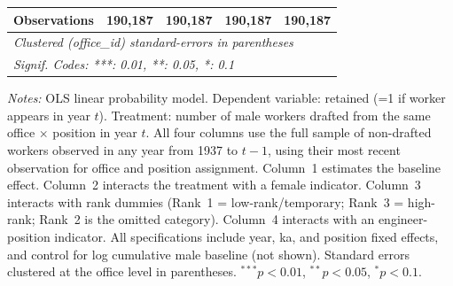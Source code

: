 \begin{table}[htbp]
\begin{threeparttable}
\begin{tabular}{lcccc}
   Observations                   & 190,187  & 190,187          & 190,187        & 190,187\\  
   \midrule \midrule
   \multicolumn{5}{l}{\emph{Clustered (office\_id) standard-errors in parentheses}}\\
   \multicolumn{5}{l}{\emph{Signif. Codes: ***: 0.01, **: 0.05, *: 0.1}}\\
\end{tabular}
\begin{tablenotes}[flushleft]
\footnotesize
\item \textit{Notes:} OLS linear probability model. Dependent variable: retained (=1 if worker appears in year $t$). Treatment: number of male workers drafted from the same office $\times$ position in year $t$. All four columns use the full sample of non-drafted workers observed in any year from 1937 to $t-1$, using their most recent observation for office and position assignment. Column~1 estimates the baseline effect. Column~2 interacts the treatment with a female indicator. Column~3 interacts with rank dummies (Rank~1 = low-rank/temporary; Rank~3 = high-rank; Rank~2 is the omitted category). Column~4 interacts with an engineer-position indicator. All specifications include year, ka, and position fixed effects, and control for log cumulative male baseline (not shown). Standard errors clustered at the office level in parentheses. $^{***}p<0.01$, $^{**}p<0.05$, $^{*}p<0.1$.
\end{tablenotes}
\end{threeparttable}
\end{table}
